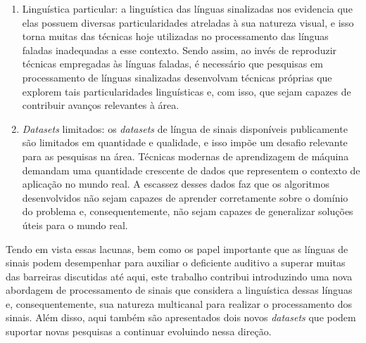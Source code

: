 \begin{enumerate}
    \item Linguística particular: a linguística das línguas sinalizadas nos evidencia que elas possuem diversas particularidades atreladas à sua natureza visual, e isso torna muitas das técnicas hoje utilizadas no processamento das línguas faladas inadequadas a esse contexto.
    Sendo assim, ao invés de reproduzir técnicas empregadas às línguas faladas, é necessário que pesquisas em processamento de línguas sinalizadas desenvolvam técnicas próprias que explorem tais particularidades linguísticas e, com isso, que sejam capazes de contribuir avanços relevantes à área.
    
    \item \textit{Datasets} limitados: os \textit{datasets} de língua de sinais disponíveis publicamente são limitados em quantidade e qualidade, e isso impõe um desafio relevante para as pesquisas na área. Técnicas modernas de aprendizagem de máquina demandam uma quantidade crescente de dados que representem o contexto de aplicação no mundo real. A escassez desses dados faz que os algoritmos desenvolvidos não sejam capazes de aprender corretamente sobre o domínio do problema e, consequentemente, não sejam capazes de generalizar soluções úteis para o mundo real.
    
\end{enumerate}


Tendo em vista essas lacunas, bem como os papel importante que as línguas de sinais podem desempenhar para auxiliar o deficiente auditivo a superar muitas das barreiras discutidas até aqui, este trabalho contribui introduzindo uma nova abordagem de processamento de sinais que considera a linguística dessas línguas e, consequentemente, sua natureza multicanal para realizar o processamento dos sinais. Além disso, aqui também são apresentados dois novos \textit{datasets} que podem suportar novas pesquisas a continuar evoluindo nessa direção.





